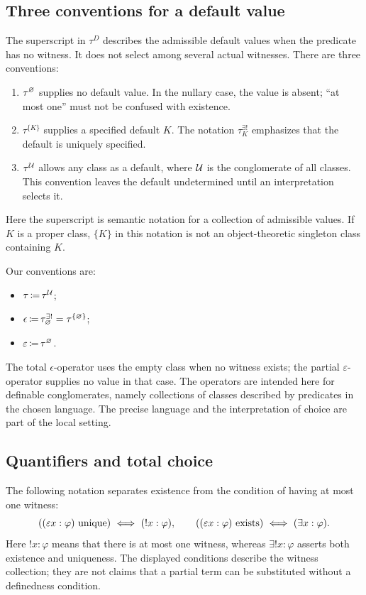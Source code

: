 \subsection{Three conventions for a default value}
The superscript in $\tau^D$ describes the admissible default values when the
predicate has no witness. It does not select among several actual witnesses.
There are three conventions:
\begin{enumerate}
\item $\tau^\varnothing$ supplies no default value. In the nullary case,
  the value is absent; ``at most one'' must not be confused with existence.
\item $\tau^{\{K\}}$ supplies a specified default $K$. The notation
  $\tau^{\exists!}_K$ emphasizes that the default is uniquely specified.
\item $\tau^{\mathcal{U}}$ allows any class as a default, where $\mathcal{U}$ is the
  conglomerate of all classes. This convention leaves the default
  undetermined until an interpretation selects it.
\end{enumerate}
Here the superscript is semantic notation for a collection of admissible
values. If $K$ is a proper class, $\{K\}$ in this notation is not an
object-theoretic singleton class containing $K$.

Our conventions are:
\begin{itemize}
\item $\tau \,{\coloneqq}\, \tau^{\mathcal{U}}$;
\item $\epsilon \,{\coloneqq}\, \tau^{\exists!}_\varnothing = \tau^{\{\varnothing\}}$;
\item $\varepsilon \,{\coloneqq}\, \tau^\varnothing$.
\end{itemize}
The total $\epsilon$-operator uses the empty class when no witness exists;
the partial $\varepsilon$-operator supplies no value in that case. The
operators are intended here for definable conglomerates, namely collections
of classes described by predicates in the chosen language. The precise
language and the interpretation of choice are part of the local setting.

\subsection{Quantifiers and total choice}
The following notation separates existence from the condition of having
at most one witness:
\[
((\varepsilon x:\varphi) \mathrm{\ unique}) \ \Longleftrightarrow\  (!x:\varphi),
\qquad
((\varepsilon x:\varphi) \mathrm{\ exists}) \ \Longleftrightarrow\  (\exists x:\varphi).
\]
Here $!x:\varphi$ means that there is at most one witness, whereas
$\exists!x:\varphi$ asserts both existence and uniqueness. The displayed
conditions describe the witness collection; they are not claims that a
partial term can be substituted without a definedness condition.

